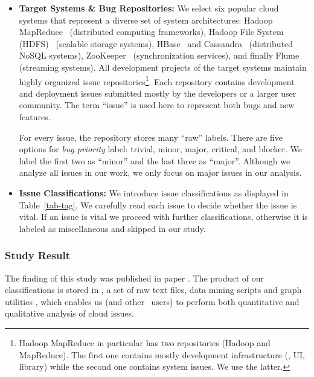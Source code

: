 \begin{itemize}

\item {\bf Target Systems \& Bug Repositories:} We select six popular cloud
systems that represent a diverse set of system architectures: Hadoop
MapReduce~\cite{HadoopWeb} (distributed computing frameworks), Hadoop File
System (HDFS)~\cite{HDFSWeb} (scalable storage systems), HBase~\cite{HBaseWeb}
and Cassandra~\cite{CassandraWeb} (distributed NoSQL systems),
ZooKeeper~\cite{ZooKeeperWeb} (synchronization services), and finally
Flume~\cite{FlumeWeb} (streaming systems).
%
All development projects of the target systems maintain highly organized issue
repositories\footnote{Hadoop MapReduce in particular has two repositories
(Hadoop and MapReduce). The first one contains mostly development
infrastructure (\eg, UI, library) while the second one contains system issues.
We use the latter.}.
%
Each repository contains development and deployment issues submitted mostly by
the developers or a larger user community. The term ``issue'' is used here to
represent both bugs and new features.

For every issue, the repository stores many ``raw'' labels. There are five
options for {\em bug priority} label: trivial, minor, major, critical, and
blocker. We label the first two as ``minor'' and the last three as ``major''.
Although we analyze all issues in our work, we only focus on major issues in
our analysis.
\fi

\item {\bf Issue Classifications:} We introduce issue classifications as
displayed in Table~\ref{tab-tag}. 
%
We carefully read each issue to decide whether the issue is vital. If an issue
is vital we proceed with further classifications, otherwise it is labeled as
miscellaneous and skipped in our study. 

\end{itemize}

\subsubsection{Study Result}

The finding of this study was published in \cbs paper \cite{Gunawi+14-Cbs}.  The
product of our classifications is stored in \cdb, a set of raw text files, data
mining scripts and graph utilities \cite{CBS}, which enables us (and other \cdb\
users) to perform both quantitative and qualitative analysis of cloud issues. 

